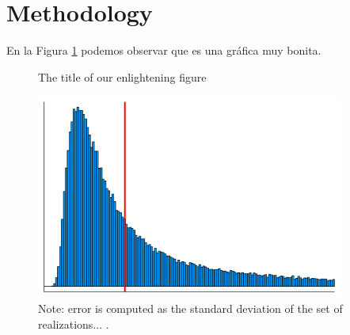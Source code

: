 \section{Methodology}
\label{section:methodology}


En la Figura \ref{figure:awesome_figure} podemos observar que es una gráfica muy bonita.


\begin{figure}[htb]
  \caption{The title of our enlightening figure}
  \label{figure:awesome_figure}
  \centering 
  \includegraphics[width=0.9\textwidth]{figures/mse_distribution.png}
  \caption*{\footnotesize Note: error is computed as the standard deviation of the set of realizations... .}
\end{figure}